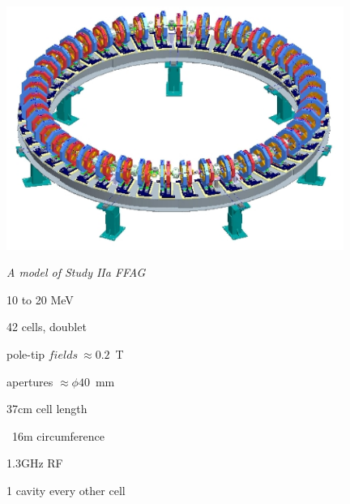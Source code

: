 \documentclass[12pt]{article}
\begin{document}
\begin{minipage}[c]{0.38\linewidth}
\vspace{1ex}
  \begin{center}

  \includegraphics*[width=11.00cm]{./figs_FFAG_introSlides/emmaRing.eps}

\it
A model of Study IIa FFAG 

\vspace{-.4ex}
10 to 20 MeV 

\vspace{-.4ex}
 42 cells, doublet

\vspace{-.4ex}
 pole-tip $fields ~ \approx 0.2$~T

\vspace{-.4ex}
 apertures $\approx \phi40$~mm

\vspace{-.4ex}
 37cm cell length 

\vspace{-.4ex}
 ~16m circumference 

\vspace{-.4ex}
 1.3GHz  RF

\vspace{-.4ex}  
 1 cavity every other cell 
  \end{center}
\end{minipage} ~ ~ ~ ~ ~ ~ 
\end{document}
